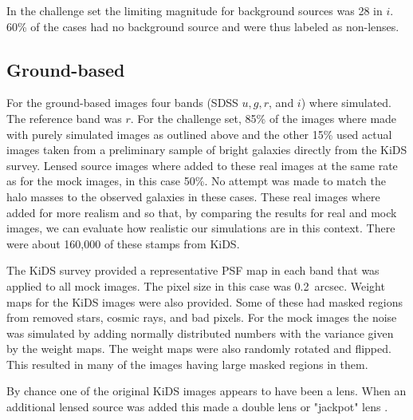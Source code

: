 \documentclass{aa}
\begin{document}
 In the challenge set the limiting magnitude for background sources was 28 in $i$.   60\% of the cases had no background source and were thus labeled as non-lenses.
 
\subsection{Ground-based}
\label{sec:sim-ground-based}

For the ground-based images four bands (SDSS $u,g,r$, and $i$) where simulated.  The reference band was $r$.  For the challenge set, 85\% of the images where made with purely simulated images as outlined above and the other 15\% used actual images taken from a preliminary sample of bright galaxies directly from the KiDS survey.  Lensed source images where added to these real images at the same rate as for the mock images,  in this case 50\%.  No attempt was made to match the halo masses to the observed galaxies in these cases.  These real images where added for more realism and so that, by comparing the results for real and mock images, we can evaluate how realistic our simulations are in this context.  There were about 160,000 of these stamps from KiDS.

The KiDS survey provided a representative PSF map in each band that was applied to all mock images.   The pixel size in this case was 0.2~arcsec. 
Weight maps for the KiDS images were also provided.  Some of these had masked regions from removed stars, cosmic rays, and bad pixels.  For the mock images the noise was simulated by adding normally distributed numbers with the variance given by the weight maps.  The weight maps were also randomly rotated and flipped.  This resulted in many of the images having large masked regions in them.

By chance one of the original KiDS images appears to have been a lens.  When an additional lensed source was added this made a double lens or "jackpot" lens \citep{2008ApJ...677.1046G}.
\end{document}
